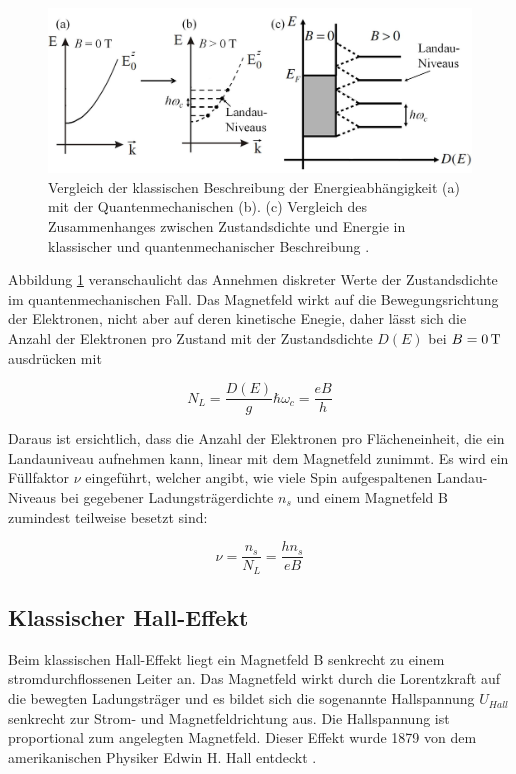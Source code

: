 \begin{figure}[h]
\centering
\includegraphics[width=0.7\linewidth]{images/Anleitungsheft/Landauniveaus_Anleitungsheft.png}
\caption[Landau Niveaus]{Vergleich der klassischen Beschreibung der Energieabhängigkeit (a) mit der Quantenmechanischen (b). (c) Vergleich des Zusammenhanges zwischen Zustandsdichte und Energie in klassischer und quantenmechanischer Beschreibung \cite{anleitung}.}
\label{fig:Landauniveaus_Anleitungsheft}
\end{figure}

Abbildung \ref{fig:Landauniveaus_Anleitungsheft} veranschaulicht das Annehmen diskreter Werte der Zustandsdichte im quantenmechanischen Fall. 
Das Magnetfeld wirkt auf die Bewegungsrichtung der Elektronen, nicht aber auf deren kinetische Enegie, daher lässt sich die Anzahl der Elektronen pro Zustand mit der Zustandsdichte $D(E)$ bei $B=\unit[0]{T}$ ausdrücken mit

\begin{equation}
N_L=\frac{D(E)}{g}\hbar\omega_c = \frac{eB}{h}
\label{eq:zustandsd_pro_landauniveau}
\end{equation}

Daraus ist ersichtlich, dass die Anzahl der Elektronen pro Flächeneinheit, die ein Landauniveau aufnehmen kann, linear mit dem Magnetfeld zunimmt. Es wird ein Füllfaktor $\nu$ eingeführt, welcher angibt, wie viele Spin aufgespaltenen Landau-Niveaus bei gegebener Ladungsträgerdichte $n_s$ und einem Magnetfeld B zumindest teilweise besetzt sind:

\begin{equation}
\nu=\frac{n_s}{N_L}=\frac{hn_s}{eB}
\label{eq:einfuehrung_fuellfakt}
\end{equation}

\newpage
\subsection{Klassischer Hall-Effekt}

Beim klassischen Hall-Effekt liegt ein Magnetfeld B senkrecht zu einem stromdurchflossenen Leiter an. Das Magnetfeld wirkt durch die Lorentzkraft auf die bewegten Ladungsträger und es bildet sich die sogenannte Hallspannung $U_{Hall}$ senkrecht zur Strom- und Magnetfeldrichtung aus. Die Hallspannung ist proportional zum angelegten Magnetfeld. Dieser Effekt wurde 1879 von dem amerikanischen Physiker Edwin H. Hall entdeckt \cite[Kap. 10.7]{tipler_modern_2008}. 

